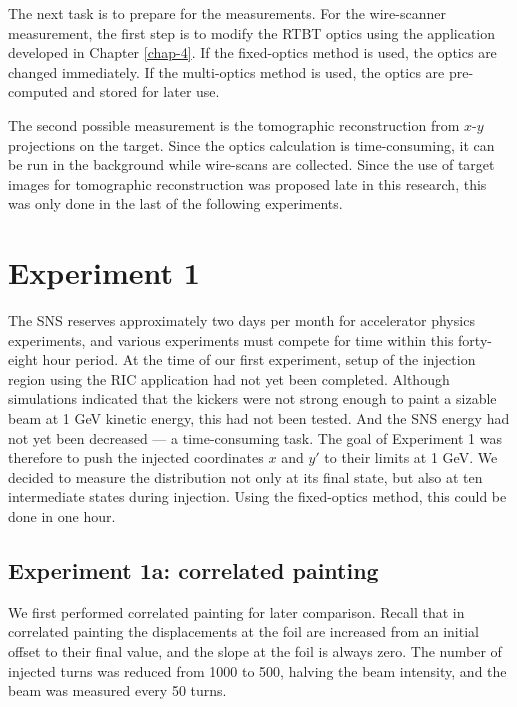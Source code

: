 %
The next task is to prepare for the measurements. For the wire-scanner measurement, the first step is to modify the RTBT optics using the application developed in Chapter \ref{chap-4}. If the fixed-optics method is used, the optics are changed immediately. If the multi-optics method is used, the optics are pre-computed and stored for later use. 

The second possible measurement is the tomographic reconstruction from $x$-$y$ projections on the target. Since the optics calculation is time-consuming, it can be run in the background while wire-scans are collected. Since the use of target images for tomographic reconstruction was proposed late in this research, this was only done in the last of the following experiments.


\section{Experiment 1}

The SNS reserves approximately two days per month for accelerator physics experiments, and various experiments must compete for time within this forty-eight hour period. At the time of our first experiment, setup of the injection region using the RIC application had not yet been completed. Although simulations indicated that the kickers were not strong enough to paint a sizable beam at 1 GeV kinetic energy, this had not been tested. And the SNS energy had not yet been decreased — a time-consuming task. The goal of Experiment 1 was therefore to push the injected coordinates $x$ and $y'$ to their limits at 1 GeV. We decided to measure the distribution not only at its final state, but also at ten intermediate states during injection. Using the fixed-optics method, this could be done in one hour.


\subsection{Experiment 1a: correlated painting}

We first performed correlated painting for later comparison. Recall that in correlated painting the displacements at the foil are increased from an initial offset to their final value, and the slope at the foil is always zero. The number of injected turns was reduced from 1000 to 500, halving the beam intensity, and the beam was measured every 50 turns. 

